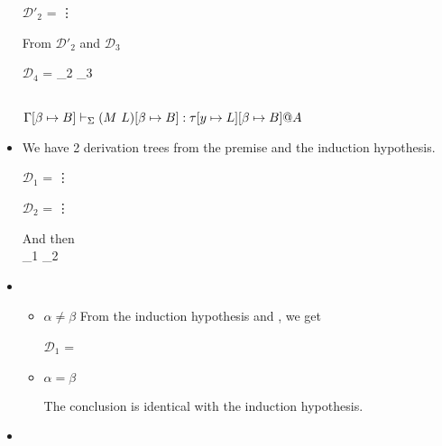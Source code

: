 \begin{itemize}
	      $\mathcal{D'}_2$ = 
	      {\vdots}
	      	      	      
	      From $\mathcal{D'}_2$ and $\mathcal{D}_3$
	      	      	      
	      $\mathcal{D}_4$ = 
	      {_2 \andalso {}_3}
	      	      	      
	       \\
	      $\GGV (M\ L)\SB: \tau[y \mapsto L]\SB@A$
	      	      	      
	\item \TConv
	      	      	      
	      We have 2 derivation trees from the premise and the induction hypothesis.
	      	      	      
	      $\mathcal{D}_1$ = 
	      {\vdots}
	      	      	      
	      $\mathcal{D}_2$ = 
	      {\vdots}
	      	      	      
	      And then \\
	      {_1 \andalso {}_2}
	      	      	      
	\item \TTB
	      	      	      
	      \begin{itemize}
	      		      		      	
	      	\item $\alpha \neq \beta$
	      	      From the induction hypothesis and \TTB, we get
	      	      	      	      	      	      
	      	      $\mathcal{D}_1$ = 
	      	      {}
	      	      	      	      	      	      
	      	\item $\alpha = \beta$
	      	      	      	      	      	      
	      	      The conclusion is identical with the induction hypothesis.
	      	      	      	      	      	      
	      \end{itemize}
	      	      	      
	\item \TTBL
	      	      	      

\end{itemize}
